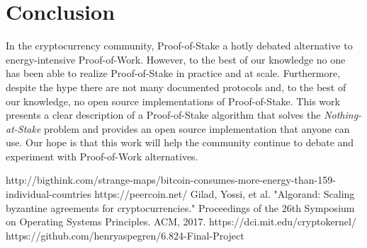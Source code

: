 \documentclass{article}
\begin{document}
\section{Conclusion}
In the cryptocurrency community, Proof-of-Stake a hotly debated alternative to energy-intensive Proof-of-Work. However, to the best of our knowledge no one has been able to realize Proof-of-Stake in practice and at scale. Furthermore, despite the hype there are not many documented protocols and, to the best of our knowledge, no open source implementations of Proof-of-Stake. This work presents a clear description of a Proof-of-Stake algorithm that solves the \textit{Nothing-at-Stake} problem and provides an open source implementation that anyone can use. Our hope is that this work will help the community continue to debate and experiment with Proof-of-Work alternatives.    


\begin{thebibliography}{9}
http://bigthink.com/strange-maps/bitcoin-consumes-more-energy-than-159-individual-countries
https://peercoin.net/
Gilad, Yossi, et al. "Algorand: Scaling byzantine agreements for cryptocurrencies." Proceedings of the 26th Symposium on Operating Systems Principles. ACM, 2017.
https://dci.mit.edu/cryptokernel/
https://github.com/henryaspegren/6.824-Final-Project
\end{thebibliography}
\end{document}
